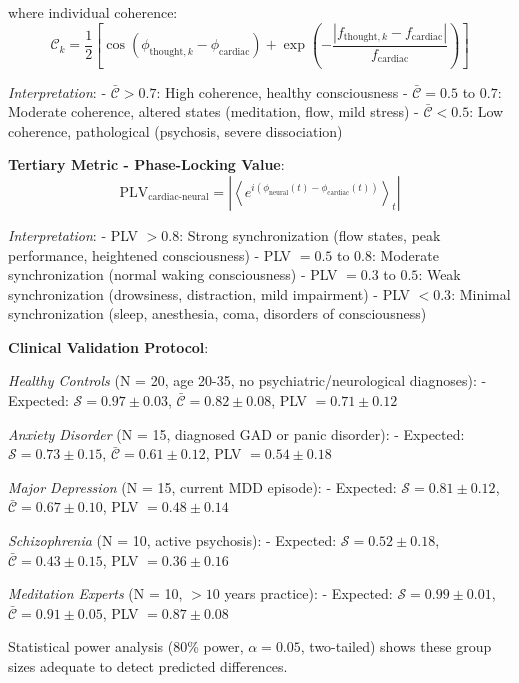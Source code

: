 \documentclass[11pt,onecolumn]{article}
\begin{document}
where individual coherence:
\begin{equation}
\mathcal{C}_k = \frac{1}{2}\left[\cos(\phi_{\text{thought},k} - \phi_{\text{cardiac}}) + \exp\left(-\frac{|f_{\text{thought},k} - f_{\text{cardiac}}|}{f_{\text{cardiac}}}\right)\right]
\end{equation}

\textit{Interpretation}:
- $\bar{\mathcal{C}} > 0.7$: High coherence, healthy consciousness
- $\bar{\mathcal{C}} = 0.5$ to $0.7$: Moderate coherence, altered states (meditation, flow, mild stress)
- $\bar{\mathcal{C}} < 0.5$: Low coherence, pathological (psychosis, severe dissociation)

\textbf{Tertiary Metric - Phase-Locking Value}:
\begin{equation}
\text{PLV}_{\text{cardiac-neural}} = \left|\left\langle e^{i(\phi_{\text{neural}}(t) - \phi_{\text{cardiac}}(t))}\right\rangle_t\right|
\end{equation}

\textit{Interpretation}:
- PLV $> 0.8$: Strong synchronization (flow states, peak performance, heightened consciousness)
- PLV $= 0.5$ to $0.8$: Moderate synchronization (normal waking consciousness)
- PLV $= 0.3$ to $0.5$: Weak synchronization (drowsiness, distraction, mild impairment)
- PLV $< 0.3$: Minimal synchronization (sleep, anesthesia, coma, disorders of consciousness)

\textbf{Clinical Validation Protocol}:

\textit{Healthy Controls} (N = 20, age 20-35, no psychiatric/neurological diagnoses):
- Expected: $\mathcal{S} = 0.97 \pm 0.03$, $\bar{\mathcal{C}} = 0.82 \pm 0.08$, PLV $= 0.71 \pm 0.12$

\textit{Anxiety Disorder} (N = 15, diagnosed GAD or panic disorder):
- Expected: $\mathcal{S} = 0.73 \pm 0.15$, $\bar{\mathcal{C}} = 0.61 \pm 0.12$, PLV $= 0.54 \pm 0.18$

\textit{Major Depression} (N = 15, current MDD episode):
- Expected: $\mathcal{S} = 0.81 \pm 0.12$, $\bar{\mathcal{C}} = 0.67 \pm 0.10$, PLV $= 0.48 \pm 0.14$

\textit{Schizophrenia} (N = 10, active psychosis):
- Expected: $\mathcal{S} = 0.52 \pm 0.18$, $\bar{\mathcal{C}} = 0.43 \pm 0.15$, PLV $= 0.36 \pm 0.16$

\textit{Meditation Experts} (N = 10, $>10$ years practice):
- Expected: $\mathcal{S} = 0.99 \pm 0.01$, $\bar{\mathcal{C}} = 0.91 \pm 0.05$, PLV $= 0.87 \pm 0.08$

Statistical power analysis (80\% power, $\alpha = 0.05$, two-tailed) shows these group sizes adequate to detect predicted differences.
\end{document}
